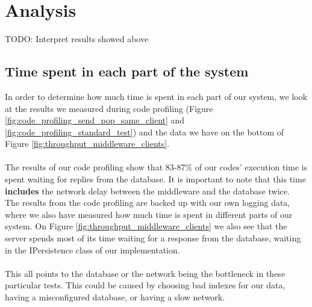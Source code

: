 \documentclass{article}
\begin{document}
    \section{Analysis}
        TODO: Interpret results showed above
        \subsection{Time spent in each part of the system}
            In order to determine how much time is spent in each part of our system, we look at the results we measured during code profiling (Figure \ref{fig:code_profiling_send_pop_same_client} and \ref{fig:code_profiling_standard_test}) and the data we have on the bottom of Figure \ref{fig:throughput_middleware_clients}.\\
            \\
            The results of our code profiling show that 83-87\% of our codes' execution time is spent waiting for replies from the database. It is important to note that this time \textbf{includes} the network delay between the middleware and the database twice.\\
            The results from the code profiling are backed up with our own logging data, where we also have measured how much time is spent in different parts of our system. On Figure \ref{fig:throughput_middleware_clients} we also see that the server spends most of its time waiting for a response from the database, waiting in the IPersistence class of our implementation.\\
            \\
            This all points to the database or the network being the bottleneck in these particular tests. This could be caused by choosing bad indexes for our data, having a misconfigured database, or having a slow network.

\end{document}
